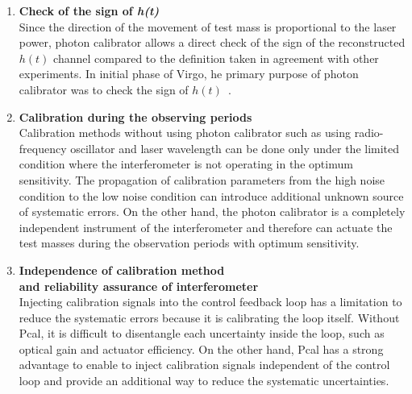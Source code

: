 \begin{enumerate}
\item {\bf Check of the sign of \sl h(t)}\\
Since the direction of the movement of test mass is proportional to the 
laser power, photon calibrator allows a direct check of the sign of the 
reconstructed $h(t)$ channel compared to the definition taken in agreement 
with other experiments. In initial phase of Virgo, he primary purpose of 
photon calibrator was to check the sign of $h(t)$~\cite{VIR-018}.

\item {\bf Calibration during the observing periods}\\
Calibration methods without using photon calibrator such as using 
radio-frequency oscillator and laser wavelength can be done only under the 
limited condition where the interferometer is not operating in the optimum 
sensitivity. The propagation of calibration parameters from the high noise 
condition to the low noise condition can introduce additional unknown source 
of systematic errors. On the other hand, the photon calibrator is a completely 
independent instrument of the interferometer and therefore can actuate 
the test masses during the observation periods with optimum sensitivity. 


\item {\bf Independence of calibration method\\
      and reliability assurance of interferometer}\\
Injecting calibration signals into the control feedback loop has a limitation 
to reduce the systematic errors because it is calibrating the loop itself.
Without Pcal, it is difficult to disentangle each uncertainty inside the loop, 
such as optical gain and actuator efficiency. On the other hand, Pcal has a 
strong advantage to enable to inject calibration signals independent of the 
control loop and provide an additional way to reduce the systematic 
uncertainties.


\end{enumerate}
